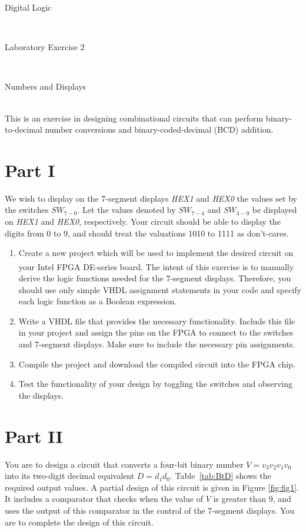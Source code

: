 \documentclass[epsfig,10pt,fullpage]{article}
\newcommand{\LabNum}{2}
\begin{document}
\centerline{\huge Digital Logic}
~\\
\centerline{\huge Laboratory Exercise \LabNum}
~\\
\centerline{\large Numbers and Displays}
~\\

\noindent
This is an exercise in designing combinational circuits that can perform
binary-to-decimal number conversions and binary-coded-decimal (BCD) addition.
~\\

\section*{Part I}
We wish to display on the 7-segment displays {\it HEX1} and {\it HEX0} the 
values set by the switches $SW_{7-0}$. 
Let the values denoted by $SW_{7-4}$ and $SW_{3-0}$ be displayed on {\it HEX1} and {\it HEX0}, 
respectively.
Your circuit should be able to display the digits from 0 to 9, and should treat the
valuations 1010 to 1111 as don't-cares.

\begin{enumerate}
\item Create a new project which will be used to implement the desired
circuit on your Intel\textsuperscript{\textregistered} FPGA DE-series board. The intent of this exercise is to manually 
derive the logic functions needed for the 7-segment displays. Therefore, you should use only
simple VHDL assignment statements in your code and specify each logic function as
a Boolean expression.
\item Write a VHDL file that provides the necessary functionality. Include this 
file in your project and assign the pins on the FPGA to connect to the 
switches and 7-segment displays. Make sure to include the necessary pin assignments.
\item Compile the project and download the compiled circuit into the FPGA
chip.
\item Test the functionality of your design by toggling the switches
and observing the displays.
\end{enumerate}

\section*{Part II}
You are to design a circuit that converts a four-bit binary number $V = v_3 v_2 v_1 v_0$
into its two-digit decimal equivalent $D = d_1 d_0$. Table~\ref{tab:BtD} shows the required output
values. A partial design of this circuit is given in Figure \ref{fig:fig1}. It includes a comparator
that checks when the value of $V$ is greater than 9, and uses the output of this
comparator in the control of the 7-segment displays. You are to complete the design of
this circuit. 
\end{document}
